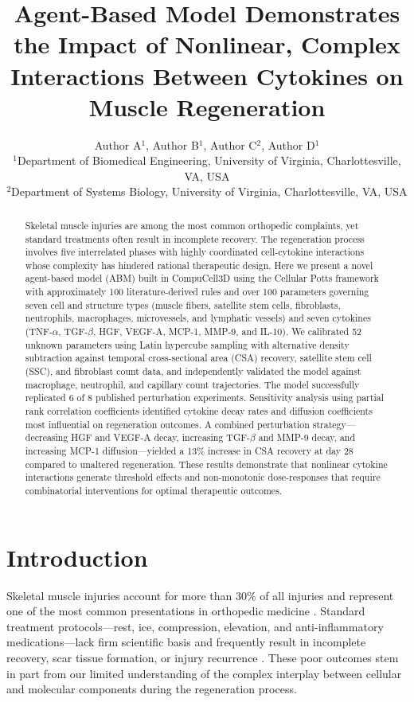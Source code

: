 \documentclass[11pt]{article}
\title{Agent-Based Model Demonstrates the Impact of Nonlinear, Complex Interactions Between Cytokines on Muscle Regeneration}
\author{Author A$^{1}$, Author B$^{1}$, Author C$^{2}$, Author D$^{1}$ \\
\small $^{1}$Department of Biomedical Engineering, University of Virginia, Charlottesville, VA, USA \\
\small $^{2}$Department of Systems Biology, University of Virginia, Charlottesville, VA, USA}
\date{}
\begin{document}
\maketitle

\begin{abstract}
Skeletal muscle injuries are among the most common orthopedic complaints, yet standard treatments often result in incomplete recovery. The regeneration process involves five interrelated phases with highly coordinated cell-cytokine interactions whose complexity has hindered rational therapeutic design. Here we present a novel agent-based model (ABM) built in CompuCell3D using the Cellular Potts framework with approximately 100 literature-derived rules and over 100 parameters governing seven cell and structure types (muscle fibers, satellite stem cells, fibroblasts, neutrophils, macrophages, microvessels, and lymphatic vessels) and seven cytokines (TNF-$\alpha$, TGF-$\beta$, HGF, VEGF-A, MCP-1, MMP-9, and IL-10). We calibrated 52 unknown parameters using Latin hypercube sampling with alternative density subtraction against temporal cross-sectional area (CSA) recovery, satellite stem cell (SSC), and fibroblast count data, and independently validated the model against macrophage, neutrophil, and capillary count trajectories. The model successfully replicated 6 of 8 published perturbation experiments. Sensitivity analysis using partial rank correlation coefficients identified cytokine decay rates and diffusion coefficients most influential on regeneration outcomes. A combined perturbation strategy---decreasing HGF and VEGF-A decay, increasing TGF-$\beta$ and MMP-9 decay, and increasing MCP-1 diffusion---yielded a 13\% increase in CSA recovery at day 28 compared to unaltered regeneration. These results demonstrate that nonlinear cytokine interactions generate threshold effects and non-monotonic dose-responses that require combinatorial interventions for optimal therapeutic outcomes.
\end{abstract}

\section{Introduction}

Skeletal muscle injuries account for more than 30\% of all injuries and represent one of the most common presentations in orthopedic medicine \citep{jarvinen2005muscle}. Standard treatment protocols---rest, ice, compression, elevation, and anti-inflammatory medications---lack firm scientific basis and frequently result in incomplete recovery, scar tissue formation, or injury recurrence \citep{bleakley2012optimising}. These poor outcomes stem in part from our limited understanding of the complex interplay between cellular and molecular components during the regeneration process.
\end{document}
